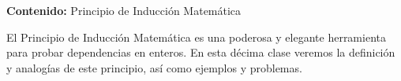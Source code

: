 {\Large\textbf{Contenido:} Principio de Inducción Matemática}

El Principio de Inducción Matemática es una poderosa y elegante herramienta para probar dependencias en enteros.
En esta décima clase veremos la definición y analogías de este principio, así como ejemplos y problemas.